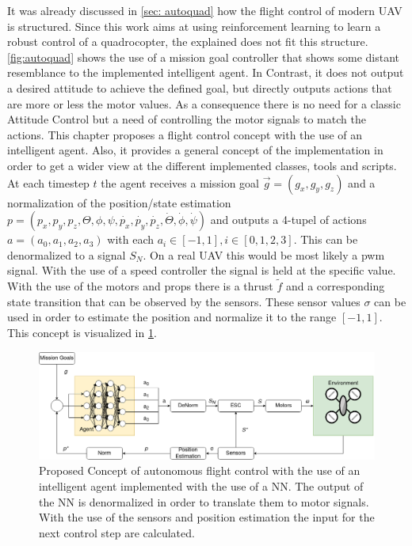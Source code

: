 It was already discussed in \cref{sec: autoquad} 
how the flight control of modern UAV is structured. 
Since this work aims at using reinforcement learning to learn a robust control of a quadrocopter, the explained does not fit this structure. 
\cref{fig:autoquad} shows the use of a mission goal controller that shows some distant resemblance to the implemented intelligent agent. 
In Contrast, it does not output a desired attitude to achieve the defined goal, but directly outputs actions that are more or less the motor values. 
As a consequence there is no need for a classic Attitude Control but a need of controlling the motor signals to match the actions.
This chapter proposes a flight control concept with the use of an intelligent agent. 
Also, it provides a general concept of the implementation in order to get a wider view at the different implemented classes, tools and scripts.\\
\newline
At each timestep $t$ the agent receives a mission goal $\overrightarrow{g}=(g_x, g_y, g_z)$ 
and a normalization of the position/state estimation $p=(p_x, p_y, p_z, \Theta, \phi, \psi, \dot{p_x}, \dot{p_y}, \dot{p_z}, \dot{\Theta}, \dot{\phi}, \dot{\psi})$
 and outputs a 4-tupel of actions $a = (a_0, a_1, a_2, a_3)$ with each $a_i \in [-1,1], i \in [0,1,2,3]$. This can be denormalized to a signal $S_N$. 
 On a real UAV this would be most likely a pwm signal. With the use of a speed controller the signal is held at the specific value. 
 With the use of the motors and props there is a thrust $\tilde{f}$ and a corresponding state transition that can be observed by the sensors. 
 These sensor values $\sigma$ can be used in order to estimate the position and normalize it to the range $[-1,1]$. 
 This concept is visualized in \cref{fig:conceptAuto}.

\begin{figure}[htp]
	\centering
	\includegraphics[width= 0.9 \linewidth]{figures/conceptAuto.png}
	\caption{Proposed Concept of autonomous flight control with the use of an intelligent agent implemented with the use of a NN. 
	The output of the NN is denormalized in order to translate them to motor signals. 
	With the use of the sensors and position estimation the input for the next control step are calculated.}
	\label{fig:conceptAuto}
\end{figure}

\newpage

